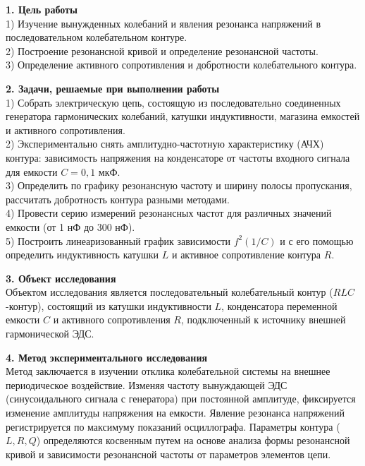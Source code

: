 \documentclass[12pt,fleqn]{article}
\begin{document}
\begin{justify}
    \textbf{1. Цель работы} \\
    1) Изучение вынужденных колебаний и явления резонанса напряжений в последовательном колебательном контуре. \\
    2) Построение резонансной кривой и определение резонансной частоты. \\
    3) Определение активного сопротивления и добротности колебательного контура. \\
\end{justify}

\begin{justify}
    \textbf{2. Задачи, решаемые при выполнении работы} \\
    1) Собрать электрическую цепь, состоящую из последовательно соединенных генератора гармонических колебаний, катушки индуктивности, магазина емкостей и активного сопротивления. \\
    2) Экспериментально снять амплитудно-частотную характеристику (АЧХ) контура: зависимость напряжения на конденсаторе от частоты входного сигнала для емкости $C=0{,}1$ мкФ. \\
    3) Определить по графику резонансную частоту и ширину полосы пропускания, рассчитать добротность контура разными методами. \\
    4) Провести серию измерений резонансных частот для различных значений емкости (от 1 нФ до 300 нФ). \\
    5) Построить линеаризованный график зависимости $f^2(1/C)$ и с его помощью определить индуктивность катушки $L$ и активное сопротивление контура $R$.
\end{justify}

\begin{justify}
    \textbf{3. Объект исследования} \\
    Объектом исследования является последовательный колебательный контур ($RLC$-контур), состоящий из катушки индуктивности $L$, конденсатора переменной емкости $C$ и активного сопротивления $R$, подключенный к источнику внешней гармонической ЭДС.
\end{justify}

\begin{justify}
    \textbf{4. Метод экспериментального исследования} \\
    Метод заключается в изучении отклика колебательной системы на внешнее периодическое воздействие. Изменяя частоту вынуждающей ЭДС (синусоидального сигнала с генератора) при постоянной амплитуде, фиксируется изменение амплитуды напряжения на емкости. Явление резонанса напряжений регистрируется по максимуму показаний осциллографа. Параметры контура ($L, R, Q$) определяются косвенным путем на основе анализа формы резонансной кривой и зависимости резонансной частоты от параметров элементов цепи.
\end{justify}
\end{document}
